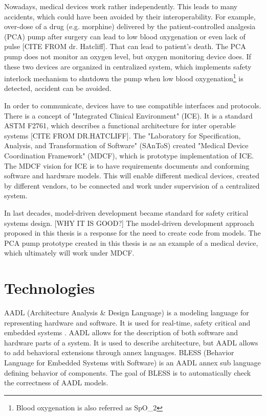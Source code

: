 Nowadays, medical devices work rather independently. This leads to many accidents, which could have been avoided by their interoperability. For example, over-dose of a drug (e.g. morphine) delivered by the patient-controlled analgesia (PCA) pump after surgery can lead to low blood oxygenation or even lack of pulse [CITE FROM dr. Hatcliff]. That can lead to patient's death. The PCA pump does not monitor an oxygen level, but oxygen monitoring device does. If these two devices are organized in centralized system, which implements safety interlock mechanism to shutdown the pump when low blood oxygenation\footnote{Blood oxygenation is also referred as SpO_2} is detected, accident can be avoided. 

In order to communicate, devices have to use compatible interfaces and protocols. There is a concept of "Integrated Clinical Environment" (ICE). It is a standard ASTM F2761, which describes a functional architecture for inter operable systems [CITE FROM DR.HATCLIFF]. The "Laboratory for Specification, Analysis, and Transformation of Software" (SAnToS) created "Medical Device Coordination Framework" (MDCF), which is prototype implementation of ICE. The MDCF vision for ICE is to have requirements documents and conforming software and hardware models. This will enable different medical devices, created by different vendors, to be connected and work under supervision of a centralized system.

In last decades, model-driven development \cite{ModelDrivenDevelopmentBook} became standard for safety critical systems design. [WHY IT IS GOOD?] The model-driven development approach proposed in this thesis is a response for the need to create code from models. The PCA pump prototype created in this thesis is as an example of a medical device, which ultimately will work under MDCF.


\section{Technologies}
\label{introduction:technologies}

AADL (Architecture Analysis \& Design Language) \cite{AadlBook} is a modeling language for representing hardware and software. It is used for real-time, safety critical and embedded systems \cite{AADL:Paper}. AADL allows for the description of both software and hardware parts of a system. It is used to describe architecture, but AADL allows to add behavioral extensions through annex languages. BLESS (Behavior Language for Embedded Systems with Software) \cite{Bless:Paper} is an AADL annex sub language defining behavior of components. The goal of BLESS is to automatically check the correctness of AADL models.

